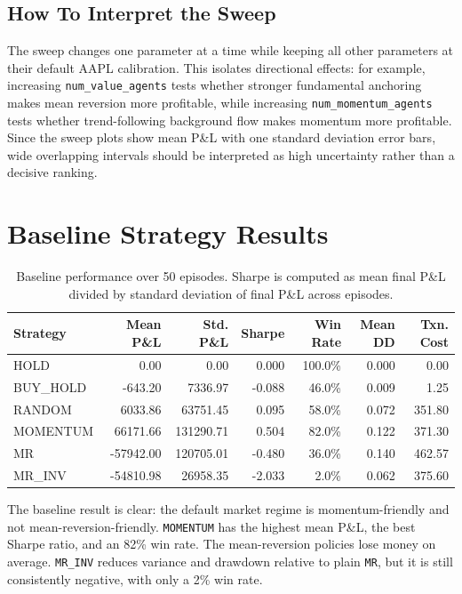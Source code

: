 \documentclass[11pt]{article}
\begin{document}
\subsection{How To Interpret the Sweep}

The sweep changes one parameter at a time while keeping all other parameters at
their default AAPL calibration. This isolates directional effects: for example,
increasing \texttt{num\_value\_agents} tests whether stronger fundamental
anchoring makes mean reversion more profitable, while increasing
\texttt{num\_momentum\_agents} tests whether trend-following background flow
makes momentum more profitable. Since the sweep plots show mean P\&L with one
standard deviation error bars, wide overlapping intervals should be interpreted
as high uncertainty rather than a decisive ranking.

\section{Baseline Strategy Results}

\begin{table}[H]
\centering
\small
\begin{tabular}{lrrrrrr}
\toprule
Strategy & Mean P\&L & Std. P\&L & Sharpe & Win Rate & Mean DD & Txn. Cost \\
\midrule
HOLD      &       0.00 &      0.00 &  0.000 & 100.0\% & 0.000 &   0.00 \\
BUY\_HOLD &    -643.20 &   7336.97 & -0.088 &  46.0\% & 0.009 &   1.25 \\
RANDOM    &    6033.86 &  63751.45 &  0.095 &  58.0\% & 0.072 & 351.80 \\
MOMENTUM  &   66171.66 & 131290.71 &  0.504 &  82.0\% & 0.122 & 371.30 \\
MR        &  -57942.00 & 120705.01 & -0.480 &  36.0\% & 0.140 & 462.57 \\
MR\_INV   &  -54810.98 &  26958.35 & -2.033 &   2.0\% & 0.062 & 375.60 \\
\bottomrule
\end{tabular}
\caption{Baseline performance over 50 episodes. Sharpe is computed as mean
final P\&L divided by standard deviation of final P\&L across episodes.}
\label{tab:baseline-results}
\end{table}

The baseline result is clear: the default market regime is momentum-friendly
and not mean-reversion-friendly. \texttt{MOMENTUM} has the highest mean P\&L,
the best Sharpe ratio, and an 82\% win rate. The mean-reversion policies lose
money on average. \texttt{MR\_INV} reduces variance and drawdown relative to
plain \texttt{MR}, but it is still consistently negative, with only a 2\% win
rate.
\end{document}
